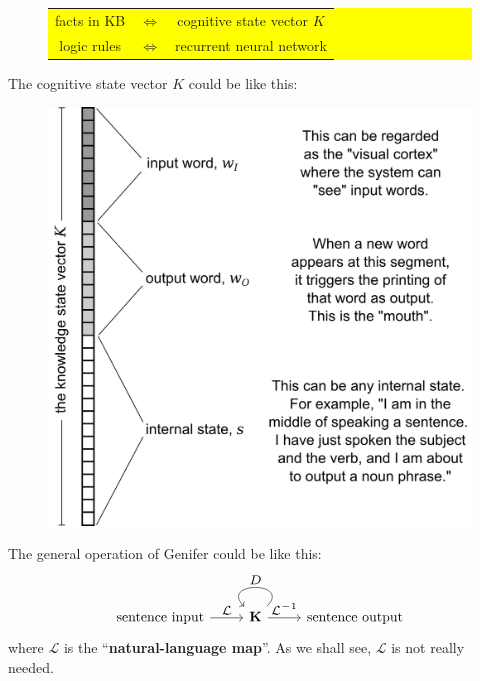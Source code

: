 \documentclass[12pt]{article}
\begin{document}
\begin{figure}[H]
\centering
\colorbox{yellow}{\parbox{0.7\textwidth}{
\begin{tabular}{ccc}
facts in KB & $\Leftrightarrow$ & cognitive state vector $K$ \\
logic rules & $\Leftrightarrow$ & recurrent neural network \\
\end{tabular}
}}
\end{figure}

The cognitive state vector $K$ could be like this:
\begin{figure}[H]
\centering
\includegraphics[scale=0.75]{internal-state-K.png}
\end{figure}

The general operation of Genifer could be like this:
\begin{equation}
\begin{tikzcd}%
\mbox{sentence input}\arrow[r,"\scalebox{1.3}{$\mathcal{L}$}"] & \mathbf{K} \arrow[r,"\scalebox{1.3}{$\mathcal{L}^{-1}$}"] \arrow[loop,"\scalebox{1.3}{$D$}",swap,looseness=4] & \mbox{sentence output}
\end{tikzcd}
\end{equation}
where $\mathcal{L}$ is the ``\textbf{natural-language map}''.  As we shall see, $\mathcal{L}$ is not really needed.
\end{document}
